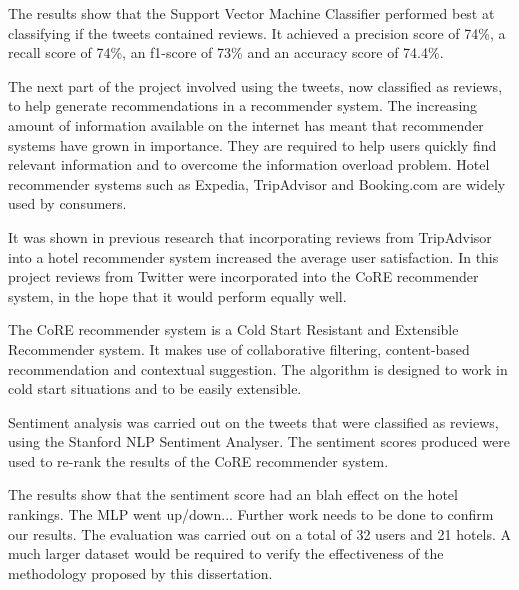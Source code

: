 The results show that the Support Vector Machine Classifier performed best at classifying if the tweets contained reviews. It achieved a precision score of 74\%, a recall score of 74\%, an f1-score of 73\% and an accuracy score of 74.4\%.

The next part of the project involved using the tweets, now classified as reviews, to help generate recommendations in a recommender system. The increasing amount of information available on the internet has meant that recommender systems have grown in importance. They are required to help users quickly find relevant information and to overcome the information overload problem. Hotel recommender systems such as Expedia, TripAdvisor and Booking.com are widely used by consumers.

It was shown in previous research that incorporating reviews from TripAdvisor into a hotel recommender system increased the average user satisfaction. In this project reviews from Twitter were incorporated into the CoRE recommender system, in the hope that it would perform equally well.

The CoRE recommender system is a Cold Start Resistant and Extensible Recommender system. It makes use of collaborative filtering, content-based recommendation and contextual suggestion. The algorithm is designed to work in cold start situations and to be easily extensible.

Sentiment analysis was carried out on the tweets that were classified as reviews, using the Stanford NLP Sentiment Analyser. The sentiment scores produced were used to re-rank the results of the CoRE recommender system.

The results show that the sentiment score had an blah effect on the hotel rankings. The MLP went up/down... Further work needs to be done to confirm our results. The evaluation was carried out on a total of 32 users and 21 hotels. A much larger dataset would be required to verify the effectiveness of the methodology proposed by this dissertation.